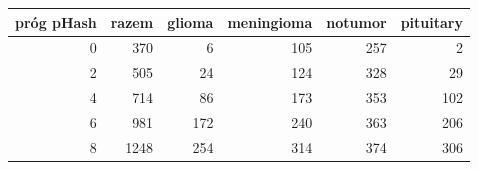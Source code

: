 \begin{tabular}{rrrrrr}
\toprule
próg pHash & razem & glioma & meningioma & notumor & pituitary \\
\midrule
0 & 370 & 6 & 105 & 257 & 2 \\
2 & 505 & 24 & 124 & 328 & 29 \\
4 & 714 & 86 & 173 & 353 & 102 \\
6 & 981 & 172 & 240 & 363 & 206 \\
8 & 1248 & 254 & 314 & 374 & 306 \\
\bottomrule
\end{tabular}
